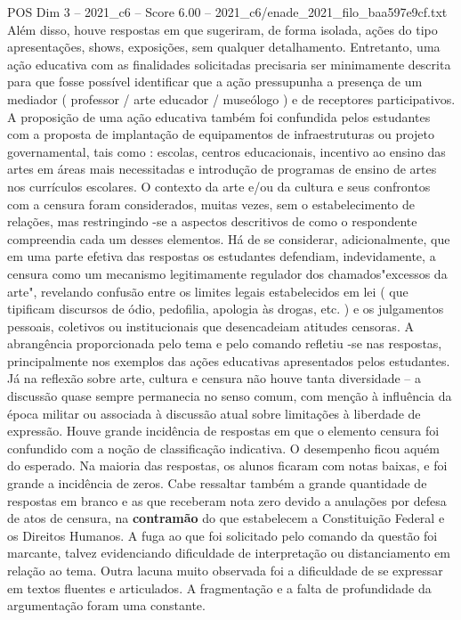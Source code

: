 \begin{textsample}{POS Dim 3 – 2021\_c6 – Score 6.00 – 2021\_c6/enade\_2021\_filo\_baa597e9cf.txt}
Além disso, houve respostas em que sugeriram, de forma isolada, ações do tipo apresentações, shows, exposições, sem qualquer detalhamento.
Entretanto, uma ação educativa com as finalidades solicitadas precisaria ser minimamente descrita para que fosse possível identificar que a ação pressupunha a presença de um mediador ( professor / arte educador / museólogo ) e de receptores participativos.
A proposição de uma ação educativa também foi confundida pelos estudantes com a proposta de implantação de equipamentos de infraestruturas ou projeto governamental, tais como : escolas, centros educacionais, incentivo ao ensino das artes em áreas mais necessitadas e introdução de programas de ensino de artes nos currículos escolares.
O contexto da arte e/ou da cultura e seus confrontos com a censura foram considerados, muitas vezes, sem o estabelecimento de relações, mas restringindo -se a aspectos descritivos de como o respondente compreendia cada um desses elementos.
Há de se considerar, adicionalmente, que em uma parte efetiva das respostas os estudantes defendiam, indevidamente, a censura como um mecanismo legitimamente regulador dos chamados"excessos da arte", revelando confusão entre os limites legais estabelecidos em lei ( que tipificam discursos de ódio, pedofilia, apologia às drogas, etc. ) e os julgamentos pessoais, coletivos ou institucionais que desencadeiam atitudes censoras.
A abrangência proporcionada pelo tema e pelo comando refletiu -se nas respostas, principalmente nos exemplos das ações educativas apresentados pelos estudantes.
Já na reflexão sobre arte, cultura e censura não houve tanta diversidade – a discussão quase sempre permanecia no senso comum, com menção à influência da época militar ou associada à discussão atual sobre limitações à liberdade de expressão.
Houve grande incidência de respostas em que o elemento censura foi confundido com a noção de classificação indicativa.
O desempenho ficou aquém do esperado.
Na maioria das respostas, os alunos ficaram com notas baixas, e foi grande a incidência de zeros.
Cabe ressaltar também a grande quantidade de respostas em branco e as que receberam nota zero devido a anulações por defesa de atos de censura, na \textbf{contramão} do que estabelecem a Constituição Federal e os Direitos Humanos.
A fuga ao que foi solicitado pelo comando da questão foi marcante, talvez evidenciando dificuldade de interpretação ou distanciamento em relação ao tema.
Outra lacuna muito observada foi a dificuldade de se expressar em textos fluentes e articulados.
A fragmentação e a falta de profundidade da argumentação foram uma constante.

\end{textsample}
